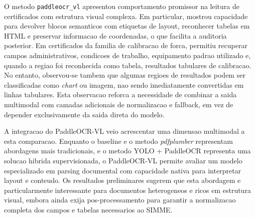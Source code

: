 O metodo \texttt{paddleocr\_vl} apresentou comportamento promissor na leitura de
certificados com estrutura visual complexa. Em particular, mostrou capacidade
para devolver blocos semanticos com etiquetas de layout, reconhecer tabelas em
HTML e preservar informacao de coordenadas, o que facilita a auditoria posterior.
Em certificados da familia de calibracao de forca, permitiu recuperar campos
administrativos, condicoes de trabalho, equipamento padrao utilizado e, quando a
regiao foi reconhecida como tabela, resultados tabulares de calibracao. No
entanto, observou-se tambem que algumas regioes de resultados podem ser
classificadas como \textit{chart} ou imagem, nao sendo imediatamente convertidas
em linhas tabulares. Esta observacao reforca a necessidade de combinar a saida
multimodal com camadas adicionais de normalizacao e fallback, em vez de depender
exclusivamente da saida direta do modelo.


A integracao do PaddleOCR-VL veio acrescentar uma dimensao multimodal a esta
comparacao. Enquanto o baseline e o metodo \textit{pdfplumber} representam
abordagens mais tradicionais, e o metodo YOLO + PaddleOCR representa uma solucao
hibrida supervisionada, o PaddleOCR-VL permite avaliar um modelo especializado
em parsing documental com capacidade nativa para interpretar layout e conteudo.
Os resultados preliminares sugerem que esta abordagem e particularmente
interessante para documentos heterogeneos e ricos em estrutura visual, embora
ainda exija pos-processamento para garantir a normalizacao completa dos campos e
tabelas necessarios ao SIMME.

